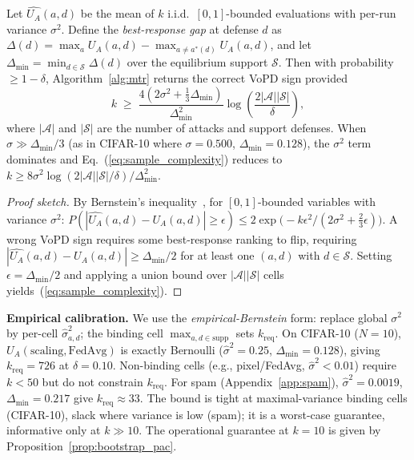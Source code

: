 \documentclass{article}
\newcommand{\UA}{U_A}
\begin{document}
\begin{proposition}
\label{thm:sample_complexity_appendix}
Let $\hat{\UA}(a,d)$ be the mean of $k$ i.i.d.\ $[0,1]$-bounded evaluations with per-run variance $\sigma^2$. Define the \emph{best-response gap} at defense $d$ as $\Delta(d) = \max_a \UA(a,d) - \max_{a \neq a^*(d)} \UA(a,d)$, and let $\Delta_{\min} = \min_{d \in \mathcal{S}} \Delta(d)$ over the equilibrium support $\mathcal{S}$. Then with probability $\geq 1-\delta$, Algorithm~\ref{alg:mtr} returns the correct VoPD sign provided
\begin{equation}
k \;\geq\; \frac{4\!\left(2\sigma^2 + \tfrac{1}{3}\Delta_{\min}\right)}{\Delta_{\min}^2} \log\!\left(\frac{2|\mathcal{A}||\mathcal{S}|}{\delta}\right),
\label{eq:sample_complexity}
\end{equation}
where $|\mathcal{A}|$ and $|\mathcal{S}|$ are the number of attacks and support defenses. When $\sigma \gg \Delta_{\min}/3$ (as in CIFAR-10 where $\sigma=0.500$, $\Delta_{\min}=0.128$), the $\sigma^2$ term dominates and Eq.~(\ref{eq:sample_complexity}) reduces to $k \geq 8\sigma^2 \log(2|\mathcal{A}||\mathcal{S}|/\delta)/\Delta_{\min}^2$.
\end{proposition}
\begin{proof}[Proof sketch]
By Bernstein's inequality~\citep{bernstein1924}, for $[0,1]$-bounded variables with variance $\sigma^2$: $P(|\hat{\UA}(a,d) - \UA(a,d)| \geq \epsilon) \leq 2\exp\!\bigl(-k\epsilon^2/(2\sigma^2 + \tfrac{2}{3}\epsilon)\bigr)$. A wrong VoPD sign requires some best-response ranking to flip, requiring $|\hat{\UA}(a,d) - \UA(a,d)| \geq \Delta_{\min}/2$ for at least one $(a,d)$ with $d \in \mathcal{S}$. Setting $\epsilon = \Delta_{\min}/2$ and applying a union bound over $|\mathcal{A}||\mathcal{S}|$ cells yields~(\ref{eq:sample_complexity}).
\end{proof}

\textbf{Empirical calibration.} We use the \emph{empirical-Bernstein} form: replace global $\sigma^2$ by per-cell $\hat{\sigma}^2_{a,d}$; the binding cell $\max_{a,d \in \text{supp}}$ sets $k_{\text{req}}$. On CIFAR-10 ($N=10$), $\UA(\text{scaling}, \text{FedAvg})$ is exactly Bernoulli ($\hat{\sigma}^2=0.25$, $\Delta_{\min}=0.128$), giving $k_{\text{req}}=726$ at $\delta=0.10$. Non-binding cells (e.g., pixel/FedAvg, $\hat{\sigma}^2<0.01$) require $k<50$ but do not constrain $k_{\text{req}}$. For spam (Appendix~\ref{app:spam}), $\hat{\sigma}^2=0.0019$, $\Delta_{\min}=0.217$ give $k_{\text{req}}\approx 33$. The bound is tight at maximal-variance binding cells (CIFAR-10), slack where variance is low (spam); it is a worst-case guarantee, informative only at $k \gg 10$. The operational guarantee at $k=10$ is given by Proposition~\ref{prop:bootstrap_pac}.
\end{document}
